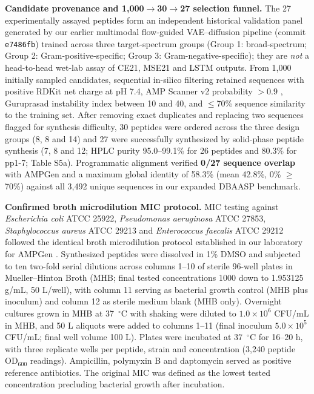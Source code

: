 \documentclass[unnumsec,webpdf,contemporary,large]{oup-authoring-template}
\newcommand{\rev}[1]{#1}
\begin{document}
\rev{\textbf{Candidate provenance and 1,000$\rightarrow$30$\rightarrow$27 selection funnel.} The 27 experimentally assayed peptides form an independent historical validation panel generated by our earlier multimodal flow-guided VAE--diffusion pipeline (commit \texttt{e7486fb}) trained across three target-spectrum groups (Group 1: broad-spectrum; Group 2: Gram-positive-specific; Group 3: Gram-negative-specific); they are \emph{not} a head-to-head wet-lab assay of CE21, MSE21 and LSTM outputs. From 1,000 initially sampled candidates, sequential in-silico filtering retained sequences with positive RDKit net charge at pH 7.4, AMP Scanner v2 probability $>0.9$ \cite{refAMPScanner}, Guruprasad instability index between 10 and 40, and $\leq$70\% sequence similarity to the training set. After removing exact duplicates and replacing two sequences flagged for synthesis difficulty, 30 peptides were ordered across the three design groups (8, 8 and 14) and 27 were successfully synthesized by solid-phase peptide synthesis (7, 8 and 12; HPLC purity 95.0--99.1\% for 26 peptides and 80.3\% for pp1-7; Table S5a). Programmatic alignment verified \textbf{0/27 sequence overlap} with AMPGen \cite{ref9} and a maximum global identity of 58.3\% (mean 42.8\%, 0\% $\geq$70\%) against all 3,492 unique sequences in our expanded DBAASP benchmark.}

\rev{\textbf{Confirmed broth microdilution MIC protocol.} MIC testing against \textit{Escherichia coli} ATCC 25922, \textit{Pseudomonas aeruginosa} ATCC 27853, \textit{Staphylococcus aureus} ATCC 29213 and \textit{Enterococcus faecalis} ATCC 29212 followed the identical broth microdilution protocol established in our laboratory for AMPGen \cite{ref9,ref64,ref65,ref66}. Synthesized peptides were dissolved in 1\% DMSO and subjected to ten two-fold serial dilutions across columns 1--10 of sterile 96-well plates in Mueller--Hinton Broth (MHB; final tested concentrations 1000 down to 1.953125 \textmu{}g/mL, 50 \textmu{}L/well), with column 11 serving as bacterial growth control (MHB plus inoculum) and column 12 as sterile medium blank (MHB only). Overnight cultures grown in MHB at 37~$^\circ$C with shaking were diluted to $1.0\times 10^6$ CFU/mL in MHB, and 50 \textmu{}L aliquots were added to columns 1--11 (final inoculum $5.0\times 10^5$ CFU/mL; final well volume 100 \textmu{}L). Plates were incubated at 37~$^\circ$C for 16--20 h, with three replicate wells per peptide, strain and concentration (3,240 peptide OD$_{600}$ readings). Ampicillin, polymyxin B and daptomycin served as positive reference antibiotics. The original MIC was defined as the lowest tested concentration precluding bacterial growth after incubation.}
\end{document}
